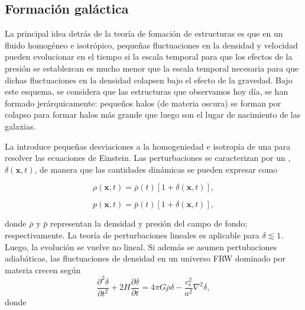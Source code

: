 
\subsection{Formación galáctica}



La principal idea detr\'as de la teor\'ia de fomaci\'on de estructuras es que en un fluido homog\'eneo e isotr\'opico, pequeñas fluctuaciones en la densidad y velocidad pueden evolucionar en el tiempo si la escala temporal para que los efectos de la presi\'on se establezcan es mucho menor que la escala temporal necesaria para que dichas fluctuaciones en la densidad colapsen bajo el efecto de la gravedad. Bajo este esquema, se considera que las estructuras que observamos hoy d\'ia, se han formado jer\'arquicamente: pequeños halos (de materia oscura) se forman por colapso para formar halos m\'as grande que luego son el lugar de nacimiento de las galaxias. \\ 

\citep{ratra}

La  introduce pequeñas desviaciones a la homogeniedad e isotrop\'ia de una  para resolver las ecuaciones de Einstein. Las perturbaciones se caracterizan por un , $\delta (\mathbf{x},t)$, de manera que las cantidades din\'amicas se pueden expresar como

\begin{equation}
\rho(\mathbf{x},t)=\bar{\rho}(t)[1 +\delta (\mathbf{x},t)],
\end{equation}

\begin{equation}
p(\mathbf{x},t)=\bar{p}(t)[1 +\delta (\mathbf{x},t)],
\end{equation}

donde $\bar{\rho}$ y $\bar{p}$ representan la densidad y presi\'on del campo de fondo; respectivamente. La teor\'ia de perturbaciones lineales es aplicable para $\delta \lesssim 1$. Luego, la evoluci\'on se vuelve no lineal. Si adem\'as se asumen pertubaciones adiab\'aticas, las fluctuaciones de densidad en un universo FRW dominado por materia crecen seg\'un\\ 

\begin{equation}
\frac{\partial^2\delta}{\partial t^2}+2H\frac{\partial\delta}{\partial t}=4\pi G \bar{\rho}\delta -\frac{c^2_{\mbox{s}}}{a^2}\nabla^2\delta,
\label{eq:densfluc}
\end{equation}
donde 


